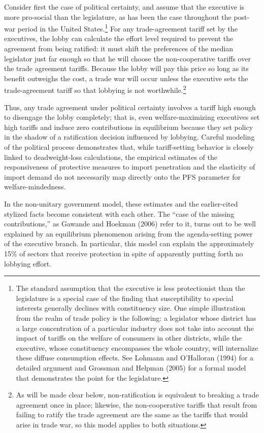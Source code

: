 \documentclass[10pt]{article}
\begin{document}
Consider first the case of political certainty, and assume that the executive is more pro-social than the legislature, as has been the case throughout the post-war period in the United States.\footnote{The standard assumption that the executive is less protectionist than the legislature is a special case of the finding that susceptibility to special interests generally declines with constituency size. One simple illustration from the realm of trade policy is the following: a legislator whose district has a large concentration of a particular industry does not take into account the impact of tariffs on the welfare of consumers in other districts, while the executive, whose constituency encompasses the whole country, will internalize these diffuse consumption effects. See Lohmann and O'Halloran (1994) for a detailed argument and Grossman and Helpman (2005) for a formal model that demonstrates the point for the legislature.\label{fn:ga_l_e}} For any trade-agreement tariff set by the executives, the lobby can calculate the effort level required to prevent the agreement from being ratified: it must shift the preferences of the median legislator just far enough so that he will choose the non-cooperative tariffs over the trade agreement tariffs. Because the lobby will pay this price so long as its benefit outweighs the cost, a trade war will occur unless the executive sets the trade-agreement tariff so that lobbying is not worthwhile.\footnote{As will be made clear below, non-ratification is equivalent to breaking a trade agreement once in place; likewise, the non-cooperative tariffs that result from failing to ratify the trade agreement are the same as the tariffs that would arise in trade war, so this model applies to both situations.}

Thus, any trade agreement under political certainty involves a tariff high enough to disengage the lobby completely; that is, even welfare-maximizing executives set high tariffs and induce zero contributions in equilibrium because they set policy in the shadow of a ratification decision influenced by lobbying. Careful modeling of the political process demonstrates that, while tariff-setting behavior is closely linked to deadweight-loss calculations, the empirical estimates of the responsiveness of protective measures to import penetration and the elasticity of import demand do not necessarily map directly onto the PFS parameter for welfare-mindedness.

In the non-unitary government model, these estimates and the earlier-cited stylized facts become consistent with each other. The ``case of the missing contributions,'' as Gawande and Hoekman (2006) refer to it, turns out to be well explained by an equilibrium phenomenon arising from the agenda-setting power of the executive branch. In particular, this model can explain the approximately 15$\%$ of sectors that receive protection in spite of apparently putting forth no lobbying effort.
\end{document}
